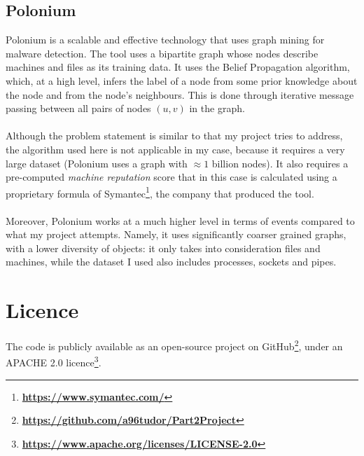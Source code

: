 	\subsection{Polonium}
	Polonium is a scalable and effective technology that uses graph mining for malware detection. The tool uses a bipartite graph whose nodes describe machines and files as its training data. It uses the Belief Propagation algorithm, which, at a high level, infers the label of a node from some prior knowledge about the node and from the node's neighbours. This is done through iterative message passing between all pairs of nodes $(u, v)$ in the graph. 
	\\ \\
	Although the problem statement is similar to that my project tries to address, the algorithm used here is not applicable in my case, because it requires a very large dataset (Polonium uses a graph with $\approx 1$ billion nodes). It also requires a pre-computed \textit{machine reputation} score that in this case is calculated using a proprietary formula of Symantec\footnote{\textbf{\url{https://www.symantec.com/}}}, the company that produced the tool. 
	\\ \\
	Moreover, Polonium works at a much higher level in terms of events compared to what my project attempts. Namely, it uses significantly coarser grained graphs, with a lower diversity of objects: it only takes into consideration files and machines, while the dataset I used also includes processes, sockets and pipes. 
	
	\section{Licence} 
	The code is publicly available as an open-source project on GitHub\footnote{\textbf{\url{https://github.com/a96tudor/Part2Project}}}, under an APACHE 2.0 licence\footnote{\textbf{\url{https://www.apache.org/licenses/LICENSE-2.0}}}. 

